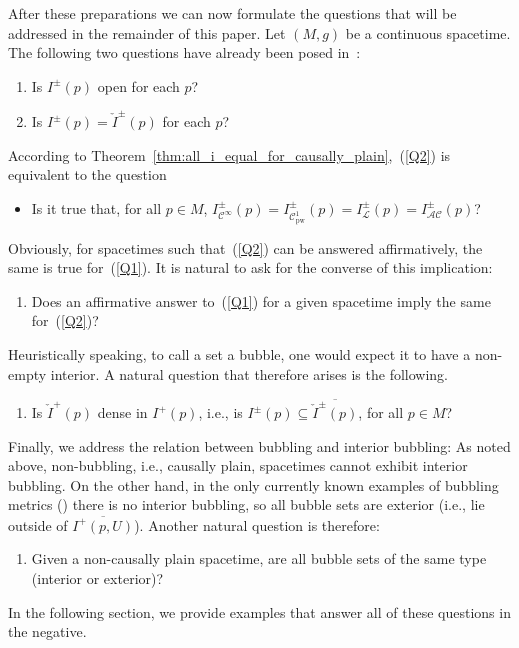\documentclass[reqno]{amsart}
\numberwithin{equation}{section}
\theoremstyle{plain}
\theoremstyle{definition}
\theoremstyle{remark}
\newcommand{\copw}{\mathcal{C}^1_{\mathrm{pw}}}
\begin{document}
After these preparations we can now formulate the questions that will be addressed in the remainder of this paper.  
Let $(M,g)$ be a continuous spacetime. The following two questions have already 
been posed in~\cite{CG:12}:
\begin{enumerate}[label={(Q\arabic*)}, ref={Q\arabic*}]
\item\label{Q1}
Is $I^\pm(p)$ open for each $p$?
\item\label{Q2}
Is $I^\pm(p)=\check I^\pm(p)$ for each $p$?
\end{enumerate}
According to Theorem~\ref{thm:all_i_equal_for_causally_plain},~(\ref{Q2}) is equivalent to the question
\begin{itemize}
\item[(Q2${}^{\prime}$)] Is it true that, for all $p\in M$, $I^\pm_{\mathcal{C}^\infty}(p) = I^\pm_{\copw}(p) = 
I^\pm_{\mathcal{L}}(p) =  I^\pm_{\mathcal{AC}}(p)$?
\end{itemize}
Obviously, for spacetimes such that~(\ref{Q2}) can be answered affirmatively, the same is true for~(\ref{Q1}). It is
natural to ask for the converse of this implication:
\begin{enumerate}[resume*]
\item\label{Q3}
Does an affirmative answer to~(\ref{Q1}) for a given spacetime imply the same for~(\ref{Q2})?
\end{enumerate}
Heuristically speaking, to call a set a bubble, one would expect it to have a non-empty interior. A natural question that therefore arises is the following. 
\begin{enumerate}[resume*]
\item\label{Q4}
Is $\check{I}^+(p)$ dense in $I^+(p)$, i.e., is $I^\pm(p) \subseteq \overline{\check I^\pm(p)}$, for all 
$p \in M$? 
\end{enumerate}
Finally, we address the relation between bubbling and interior bubbling: As noted above, non-bubbling,
i.e., causally plain, spacetimes cannot exhibit interior bubbling. On the other hand, in the only 
currently known examples of bubbling metrics (\cite[Ex.\ 1.11]{CG:12}) there is no interior bubbling,
so all bubble sets are exterior (i.e., lie outside of $\overline{I^+(p,U)}$). Another natural question is therefore:
\begin{enumerate}[resume*]
\item\label{Q5}
Given a non-causally plain spacetime, are all bubble sets of the same type (interior or exterior)? 
\end{enumerate}
In the following section, we provide examples that answer all of these questions in the negative.
\end{document}
